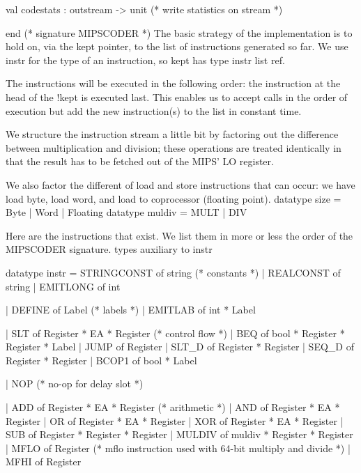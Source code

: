   val codestats : outstream -> unit     (* write statistics on stream *)

end (* signature MIPSCODER *)
\endcode
{}
The basic strategy of the implementation is to hold on, via the \code{}kept\edoc{}
pointer, to the list of instructions generated so far.
We use \code{}instr\edoc{} for the type of an instruction, so
\code{}kept\edoc{} has type \code{}instr list ref\edoc{}.

The instructions will be executed in the following order: the 
instruction at the head of the \code{}!kept\edoc{} is executed last.
This enables us to accept calls in the order of execution but
add the new instruction(s) to the list in constant time.


\enddocs
{}

We structure the instruction stream a little bit by factoring
out the difference between multiplication and division; these
operations are treated identically in that the result has to be
fetched out of the MIPS' LO register.

We also factor the different of load and store instructions that can
occur: we have load byte, load word, and load to coprocessor (floating point).
\enddocs
{}
\endmoddef
datatype size = Byte | Word | Floating
datatype muldiv = MULT | DIV
\endcode
{}

Here are the instructions that exist.
We list them in more or less the order of the MIPSCODER signature.
\enddocs
{}
\endmoddef
\LA{}types auxiliary to \code{}instr\edoc{}\RA{}

datatype instr = 
    STRINGCONST of string               (* constants *)
  | REALCONST of string
  | EMITLONG of int

  | DEFINE of Label                     (* labels *)
  | EMITLAB of int * Label

  | SLT of Register * EA * Register     (* control flow *)
  | BEQ of bool * Register * Register * Label
  | JUMP of Register 
  | SLT_D of Register * Register
  | SEQ_D of Register * Register
  | BCOP1 of bool * Label

  | NOP (* no-op for delay slot *)

  | ADD of Register * EA * Register     (* arithmetic *)
  | AND of Register * EA * Register
  | OR  of Register * EA * Register
  | XOR of Register * EA * Register
  | SUB of Register * Register * Register
  | MULDIV of muldiv * Register * Register
  | MFLO of Register    (* mflo instruction used with
                           64-bit multiply and divide *)
  | MFHI of Register

